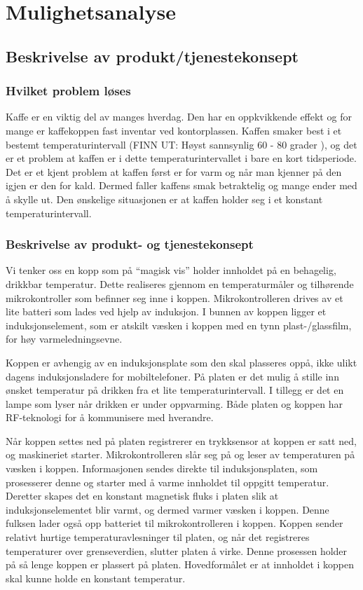 \chapter{Mulighetsanalyse}
\section{Beskrivelse av produkt/tjenestekonsept}
\subsection{Hvilket problem løses}
Kaffe er en viktig del av manges hverdag. Den har en oppkvikkende effekt og for mange er kaffekoppen fast inventar ved kontorplassen. Kaffen smaker best i et bestemt temperaturintervall (FINN UT: Høyst sannsynlig 60 - 80 grader \cite{bestekaffe} ), og det er et problem at kaffen er i dette temperaturintervallet i bare en kort tidsperiode. Det er et kjent problem at kaffen først er for varm og når man kjenner på den igjen er den for kald. Dermed faller kaffens smak betraktelig og mange ender med å skylle ut. Den ønskelige situasjonen er at kaffen holder seg i et konstant temperaturintervall. 

\subsection{Beskrivelse av produkt- og tjenestekonsept}
Vi tenker oss en kopp som på “magisk vis” holder innholdet på en behagelig, drikkbar temperatur. Dette realiseres gjennom en temperaturmåler og tilhørende mikrokontroller som befinner seg inne i koppen. Mikrokontrolleren drives av et lite batteri som lades ved hjelp av induksjon. I bunnen av koppen ligger et induksjonselement, som er atskilt væsken i koppen med en tynn plast-/glassfilm, for høy varmeledningsevne.

Koppen er avhengig av en induksjonsplate som den skal plasseres oppå, ikke ulikt dagens induksjonsladere for mobiltelefoner. På platen er det mulig å stille inn ønsket temperatur på drikken fra et lite temperaturintervall. I tillegg er det en lampe som lyser når drikken er under oppvarming. Både platen og koppen har RF-teknologi for å kommunisere med hverandre.

Når koppen settes ned på platen registrerer en trykksensor at koppen er satt ned, og maskineriet starter. Mikrokontrolleren slår seg på og leser av temperaturen på væsken i koppen. Informasjonen sendes direkte til induksjonsplaten, som prosesserer denne og starter med å varme innholdet til oppgitt temperatur. Deretter skapes det en konstant magnetisk fluks i platen slik at induksjonselementet blir varmt, og dermed varmer væsken i koppen. Denne fulksen lader også opp batteriet til mikrokontrolleren i koppen. 
Koppen sender relativt hurtige temperaturavlesninger til platen, og når det registreres temperaturer over grenseverdien, slutter platen å virke. Denne prosessen holder på så lenge koppen er plassert på platen. Hovedformålet er at innholdet i koppen skal kunne holde en konstant temperatur.

